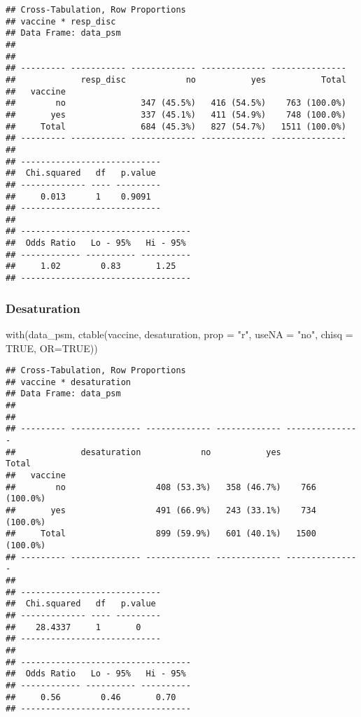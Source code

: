 \documentclass[
]{article}
\newenvironment{Shaded}{\begin{snugshade}}{\end{snugshade}}
\newcommand{\AttributeTok}[1]{\textcolor[rgb]{0.77,0.63,0.00}{#1}}
\newcommand{\ConstantTok}[1]{\textcolor[rgb]{0.00,0.00,0.00}{#1}}
\newcommand{\FunctionTok}[1]{\textcolor[rgb]{0.00,0.00,0.00}{#1}}
\newcommand{\NormalTok}[1]{#1}
\newcommand{\StringTok}[1]{\textcolor[rgb]{0.31,0.60,0.02}{#1}}
\begin{document}
\begin{verbatim}
## Cross-Tabulation, Row Proportions  
## vaccine * resp_disc  
## Data Frame: data_psm  
## 
## 
## --------- ----------- ------------- ------------- ---------------
##             resp_disc            no           yes           Total
##   vaccine                                                        
##        no               347 (45.5%)   416 (54.5%)    763 (100.0%)
##       yes               337 (45.1%)   411 (54.9%)    748 (100.0%)
##     Total               684 (45.3%)   827 (54.7%)   1511 (100.0%)
## --------- ----------- ------------- ------------- ---------------
## 
## ----------------------------
##  Chi.squared   df   p.value 
## ------------- ---- ---------
##     0.013      1    0.9091  
## ----------------------------
## 
## ----------------------------------
##  Odds Ratio   Lo - 95%   Hi - 95% 
## ------------ ---------- ----------
##     1.02        0.83       1.25   
## ----------------------------------
\end{verbatim}

\hypertarget{desaturation-1}{%
\subsubsection{Desaturation}\label{desaturation-1}}

\begin{Shaded}
\begin{Highlighting}[]
\FunctionTok{with}\NormalTok{(data\_psm, }\FunctionTok{ctable}\NormalTok{(vaccine, desaturation, }\AttributeTok{prop =} \StringTok{"r"}\NormalTok{, }\AttributeTok{useNA =} \StringTok{"no"}\NormalTok{, }\AttributeTok{chisq =} \ConstantTok{TRUE}\NormalTok{, }\AttributeTok{OR=}\ConstantTok{TRUE}\NormalTok{))}
\end{Highlighting}
\end{Shaded}

\begin{verbatim}
## Cross-Tabulation, Row Proportions  
## vaccine * desaturation  
## Data Frame: data_psm  
## 
## 
## --------- -------------- ------------- ------------- ---------------
##             desaturation            no           yes           Total
##   vaccine                                                           
##        no                  408 (53.3%)   358 (46.7%)    766 (100.0%)
##       yes                  491 (66.9%)   243 (33.1%)    734 (100.0%)
##     Total                  899 (59.9%)   601 (40.1%)   1500 (100.0%)
## --------- -------------- ------------- ------------- ---------------
## 
## ----------------------------
##  Chi.squared   df   p.value 
## ------------- ---- ---------
##    28.4337     1       0    
## ----------------------------
## 
## ----------------------------------
##  Odds Ratio   Lo - 95%   Hi - 95% 
## ------------ ---------- ----------
##     0.56        0.46       0.70   
## ----------------------------------
\end{verbatim}
\end{document}

